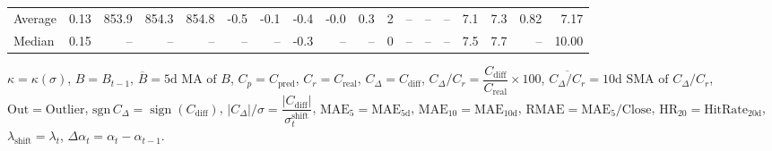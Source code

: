 \begin{threeparttable}
{\begin{tabular}{lrrrrrrrrrrrrrrrrr}
Average &     0.13 & 853.9 & 854.3 & 854.8 &       -0.5 &           -0.1 &                      -0.4 &                     -0.0 &                 0.3 &              2 &         -- &        -- &             -- &              7.1 &                 7.3 &            0.82 &                   7.17 \\
 Median &     0.15 &    -- &    -- &    -- &         -- &             -- &                      -0.3 &                       -- &                  -- &              0 &         -- &        -- &             -- &              7.5 &                 7.7 &              -- &                  10.00 \\
\bottomrule
\end{tabular}
}
\begin{tablenotes}\footnotesize
\item $\kappa=\kappa(\sigma)$, $B=B_{t-1}$, $\overline{B}=\text{5d MA of }B$, $C_p=C_{\text{pred}}$, $C_r=C_{\text{real}}$, $C_\Delta=C_{\text{diff}}$, $C_\Delta/C_r=\dfrac{C_{\text{diff}}}{C_{\text{real}}}\times100$, $\overline{C_\Delta/C_r}=\text{10d SMA of }C_\Delta/C_r$, $\mathrm{Out}=\text{Outlier}$, $\mathrm{sgn}\,C_\Delta=\operatorname{sign}(C_{\text{diff}})$, $|C_\Delta|/\sigma=\dfrac{|C_{\text{diff}}|}{\sigma_t^{\text{shift}}}$, $\mathrm{MAE}_5=\mathrm{MAE}_{5\text{d}}$, $\mathrm{MAE}_{10}=\mathrm{MAE}_{10\text{d}}$, $\mathrm{RMAE}= \mathrm{MAE}_5 / \text{Close}$, $\mathrm{HR}_{20}=\mathrm{HitRate}_{20\text{d}}$, $\lambda_{\text{shift}}=\lambda_t$, $\Delta\alpha_t=\alpha_t-\alpha_{t-1}$.
\end{tablenotes}
\end{threeparttable}
\endgroup

